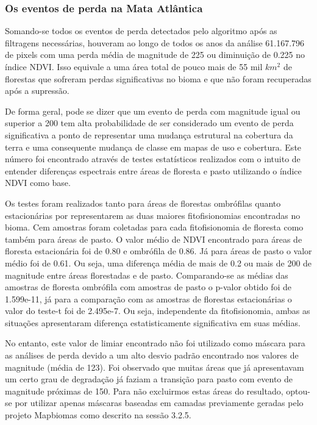 \subsubsection{Os eventos de perda na Mata Atlântica}

\hspace{13pt} Somando-se todos os eventos de perda detectados pelo algoritmo após as filtragens necessárias, houveram ao longo de todos os anos da análise 61.167.796 de pixels com uma perda média de magnitude de 225 ou diminuição de 0.225 no índice NDVI. Isso equivale a uma área total de pouco mais de 55 mil $ km^2 $ de florestas que sofreram perdas significativas no bioma e que não foram recuperadas após a supressão.

De forma geral, pode se dizer que um evento de perda com magnitude igual ou superior a 200 tem alta probabilidade de ser considerado um evento de perda significativa a ponto de representar uma mudança estrutural na cobertura da terra e uma consequente mudança de classe em mapas de uso e cobertura. Este número foi encontrado através de testes estatísticos realizados com o intuito de entender diferenças espectrais entre áreas de floresta e pasto utilizando o índice NDVI como base. 

Os testes foram realizados tanto para áreas de florestas ombrófilas quanto estacionárias por representarem as duas maiores fitofisionomias encontradas no bioma. Cem amostras foram coletadas para cada fitofisionomia de floresta como também para áreas de pasto. O valor médio de NDVI encontrado para áreas de floresta estacionária foi de 0.80 e ombrófila de 0.86. Já para áreas de pasto o valor médio foi de 0.61. Ou seja, uma diferença média de mais de 0.2 ou mais de 200 de magnitude entre áreas florestadas e de pasto. Comparando-se as médias das amostras de floresta ombrófila com amostras de pasto o p-valor obtido foi de 1.599e-11, já para a comparação com as amostras de florestas estacionárias o valor do teste-t foi de 2.495e-7. Ou seja, independente da fitofisionomia, ambas as situações apresentaram diferença estatisticamente significativa em suas médias.

No entanto, este valor de limiar encontrado não foi utilizado como máscara para as análises de perda devido a um alto desvio padrão encontrado nos valores de magnitude (média de 123). Foi observado que muitas áreas que já apresentavam um certo grau de degradação já faziam a transição para pasto com evento de magnitude próximas de 150. Para não excluirmos estas áreas do resultado, optou-se por utilizar apenas máscaras baseadas em camadas previamente geradas pelo projeto Mapbiomas como descrito na sessão 3.2.5.

